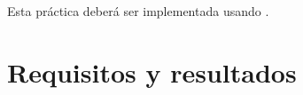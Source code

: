 % 
% 


\noindent Esta práctica deberá ser implementada usando .

\section{Requisitos y resultados}

